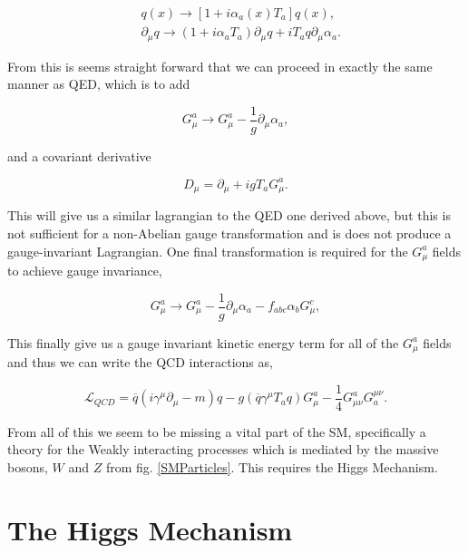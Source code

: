 \begin{equation}
\begin{split}
& q(x)\rightarrow[1+i\alpha_a(x)T_a]q(x), \\
& \partial_\mu q\rightarrow(1+i\alpha_aT_a)\partial_\mu q+iT_aq\partial_\mu\alpha_a.
\end{split}
\end{equation}

From this is seems straight forward that we can proceed in exactly the same manner as QED, which is to add

\begin{equation}
G_\mu^a\rightarrow G_\mu^a-\frac{1}{g}\partial_\mu\alpha_a, 
\end{equation}

and a covariant derivative

\begin{equation}
D_\mu=\partial_\mu+igT_aG_\mu^a.
\end{equation}

This will give us a similar lagrangian to the QED one derived above, but this is not sufficient for a non-Abelian gauge transformation and is does not produce a gauge-invariant Lagrangian. One final transformation is required for the $G_\mu^a$ fields to achieve gauge invariance, 

\begin{equation}\label{QCDGaugeTransform}
G_\mu^a\rightarrow G_\mu^a-\frac{1}{g}\partial_\mu\alpha_a-f_{abc}\alpha_b G_\mu^c,
\end{equation}

This finally give us a gauge invariant kinetic energy term for all of the $G_\mu^a$ fields and thus we can write the QCD interactions as,

\begin{equation}\label{LagrangianQCD}
\mathcal{L}_{QCD}=\overline{q}(i\gamma^\mu\partial_\mu-m)q-g(\overline{q}\gamma^\mu T_a q)G^a_\mu-\frac{1}{4}G^a_{\mu\nu}G_a^{\mu\nu}.
\end{equation}

From all of this we seem to be missing a vital part of the SM, specifically a theory for the Weakly interacting processes which is mediated by the massive bosons, $W$ and $Z$ from fig. \ref{SMParticles}. This requires the Higgs Mechanism.

\section{The Higgs Mechanism}

